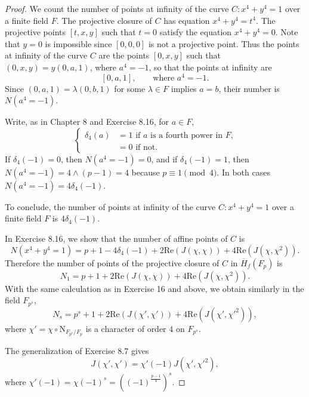 \documentclass[11pt,a4paper]{article}
\begin{document}
\begin{proof}
We count the number of points at infinity of the curve $C : x^4 + y^4 = 1$ over a finite field $F$. The projective closure of $C$ has equation $x^4 + y^4 = t^4$. The projective points $[t,x,y]$ such that $t= 0$ satisfy the equation  $x^4 + y^4 = 0$. Note that $y = 0$ is impossible since $[0,0,0]$ is not a projective point. Thus the points at infinity of the curve $C$ are the points $[0,x,y]$ such that $(0,x,y) = y (0,a,1)$, where $a^4 = -1$, so that the points at infinity are
$$[0,a,1], \qquad \text{where } a^4 = -1.$$
Since $(0,a,1) = \lambda (0,b,1)$ for some $\lambda \in F$ implies $a= b$, their number is $N(a^4 = -1)$.

Write, as in Chapter 8 and Exercise 8.16, for $a \in F$,
$$
\left\{\begin{array}{rl}
\delta_4(a) &= 1 \text{ if $a$ is a fourth power in $F$,}\\
&= 0 \text{ if not}.
\end{array}
\right.
$$
If $\delta_4(-1) = 0$, then $N(a^4 = -1) = 0$, and if  $\delta_4(-1) = 1$, then $N(a^4 = -1) = 4 \wedge (p-1) = 4$ because $p \equiv 1 \pmod 4$. In both cases $N(a^4 = -1) = 4 \delta_4(-1)$.

 To conclude, the number of points at infinity of the curve $C : x^4 + y^4 = 1$ over a finite field $F$ is $4 \delta_4(-1)$.
 
 \bigskip
 
 In Exercise 8.16, we show that the number of affine points of $C$ is
 $$N(x^4 + y^4 = 1) = p+1 -4\delta_4(-1) + 2 \mathrm{Re}(J(\chi,\chi)) + 4 \mathrm{Re}(J(\chi,\chi^2)).$$
 Therefore the number of  points of the projective closure of $C$ in $\overline{H}_f(F_p)$ is
 $$N_1 = p+1 +  2 \mathrm{Re}(J(\chi,\chi)) + 4 \mathrm{Re}(J(\chi,\chi^2)).$$
With the same calculation as in Exercise 16 and above, we obtain similarly in the field $F_{p^s}$,
$$N_s = p^s + 1 +  2 \mathrm{Re}(J(\chi',\chi')) + 4 \mathrm{Re}(J(\chi',\chi'^2)),$$
where $\chi' =\chi \circ \mathrm{N}_{F_{p^s}/F_p}$ is a character of order $4$ on $F_{p^s}$.

The generalization of Exercise 8.7 gives
$$J(\chi',\chi') = \chi'(-1) J(\chi',\chi'^2),$$
where $\chi'(-1) = \chi(-1)^s =((-1)^{\frac{p-1}{4}})^s$.


\end{proof}
\end{document}
